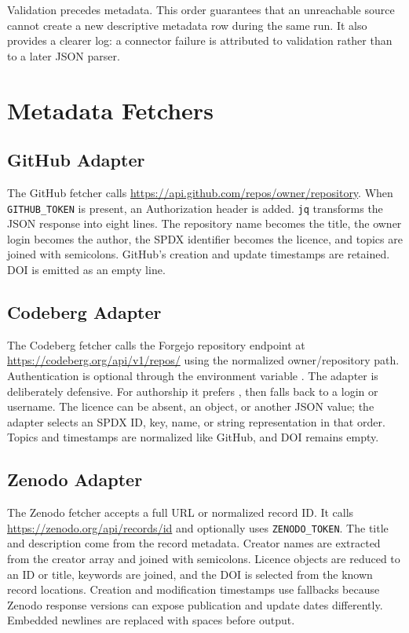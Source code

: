 Validation precedes metadata. This order guarantees that an unreachable source cannot create a new descriptive metadata row during the same run. It also provides a clearer log: a connector failure is attributed to validation rather than to a later JSON parser.

\section{Metadata Fetchers}

\subsection{GitHub Adapter}

The GitHub fetcher calls \url{https://api.github.com/repos/owner/repository}. When \texttt{GITHUB\_TOKEN} is present, an Authorization header is added. \texttt{jq} transforms the JSON response into eight lines. The repository name becomes the title, the owner login becomes the author, the SPDX identifier becomes the licence, and topics are joined with semicolons. GitHub's creation and update timestamps are retained. DOI is emitted as an empty line.

\subsection{Codeberg Adapter}

The Codeberg fetcher calls the Forgejo repository endpoint at \url{https://codeberg.org/api/v1/repos/} using the normalized owner/repository path. Authentication is optional through the environment variable . The adapter is deliberately defensive. For authorship it prefers , then falls back to a login or username. The licence can be absent, an object, or another JSON value; the adapter selects an SPDX ID, key, name, or string representation in that order. Topics and timestamps are normalized like GitHub, and DOI remains empty.

\subsection{Zenodo Adapter}

The Zenodo fetcher accepts a full URL or normalized record ID. It calls \url{https://zenodo.org/api/records/id} and optionally uses \texttt{ZENODO\_TOKEN}. The title and description come from the record metadata. Creator names are extracted from the creator array and joined with semicolons. Licence objects are reduced to an ID or title, keywords are joined, and the DOI is selected from the known record locations. Creation and modification timestamps use fallbacks because Zenodo response versions can expose publication and update dates differently. Embedded newlines are replaced with spaces before output.

